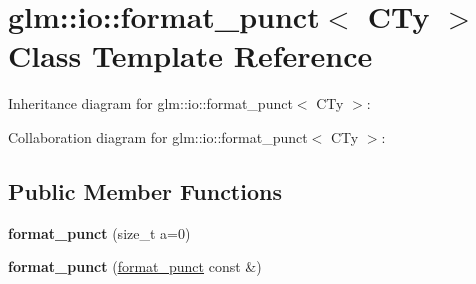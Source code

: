 \hypertarget{classglm_1_1io_1_1format__punct}{\section{glm\-:\-:io\-:\-:format\-\_\-punct$<$ C\-Ty $>$ Class Template Reference}
\label{classglm_1_1io_1_1format__punct}
}


Inheritance diagram for glm\-:\-:io\-:\-:format\-\_\-punct$<$ C\-Ty $>$\-:


Collaboration diagram for glm\-:\-:io\-:\-:format\-\_\-punct$<$ C\-Ty $>$\-:
\subsection*{Public Member Functions}
\begin{DoxyCompactItemize}
\item 
\hypertarget{classglm_1_1io_1_1format__punct_ae56e7a14fac2516658837281b9da4659}{{\bfseries format\-\_\-punct} (size\-\_\-t a=0)}\label{classglm_1_1io_1_1format__punct_ae56e7a14fac2516658837281b9da4659}

\item 
\hypertarget{classglm_1_1io_1_1format__punct_a89a8c3cfb0b975f3dd8c0416101c59b7}{{\bfseries format\-\_\-punct} (\hyperlink{classglm_1_1io_1_1format__punct}{format\-\_\-punct} const \&)}\label{classglm_1_1io_1_1format__punct_a89a8c3cfb0b975f3dd8c0416101c59b7}

\end{DoxyCompactItemize}
